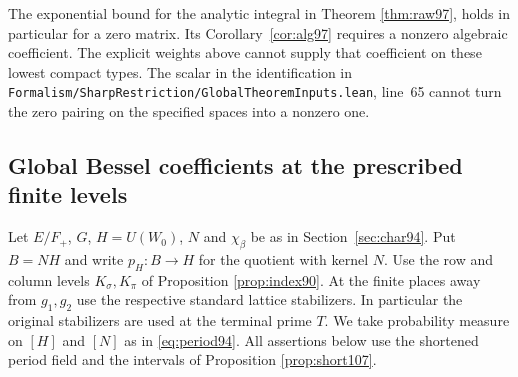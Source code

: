 \documentclass[a4paper,11pt]{article}
\theoremstyle{definition}
\theoremstyle{remark}
\newcommand{\srcloc}[2]{{\small\nolinkurl{#1.lean}}, line~#2}
\numberwithin{equation}{section}
\begin{document}
The exponential bound for the analytic integral in Theorem \ref{thm:raw97}, holds in particular for a zero matrix. Its
Corollary~\ref{cor:alg97} requires a nonzero algebraic coefficient. The
explicit weights above cannot supply that coefficient on these
lowest compact types. The scalar in the identification in
\srcloc{Formalism/SharpRestriction/GlobalTheoremInputs}{65}
cannot turn the zero pairing on the specified spaces into a
nonzero one.

\subsection{Global Bessel coefficients at the prescribed finite levels}\label{nav:VI-11}
\label{sec:global110}

Let \(E/F_+\), \(G\), \(H=U(W_0)\), \(N\) and \(\chi_\beta\)
be as in Section~\ref{sec:char94}. Put \(B=NH\) and write
\(p_H:B\to H\) for the quotient with kernel \(N\). Use the
row and column levels \(K_\sigma,K_\pi\) of
Proposition \ref{prop:index90}.
At the finite places away from \(g_1,g_2\) use the respective
standard lattice stabilizers. In particular the original
stabilizers are used at the terminal prime \(T\). We take
probability measure on \([H]\) and \([N]\) as in
\eqref{eq:period94}. All assertions below use the shortened
period field and the intervals of Proposition \ref{prop:short107}.
\end{document}
